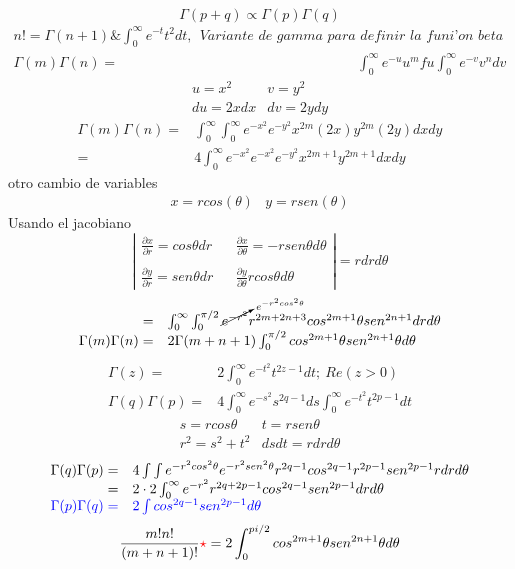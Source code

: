 \documentclass{article}
\theoremstyle{definition}
\begin{document}
\[\Gamma (p+q)\propto \Gamma (p)\Gamma (q)\]
\[
\begin{array}{rl}
	n!= \Gamma (n+1)\& \int^{\infty}_0 e^{-t}t^2 dt,\ \ \textit{Variante de gamma para definir la funi'on beta}\\
	\Gamma (m)\Gamma (n)=& \int^{\infty}_0 e^{-u}u^m fu\int^{\infty}_0 e^{-v}v^n dv
\end{array}
\]
\[
\begin{array}{cc}
	u=x^2 & v=y^2\\
	du=2xdx & dv= 2ydy
\end{array}
\]
\[
\begin{array}{rl}
	\Gamma (m)\Gamma (n) =& \int^{\infty}_0 \int^{\infty}_0e^{-x^{2}}e^{-y^{2}}x^{2m}(2x)y^{2m}(2y)dxdy\\
	=& 4\int^{\infty}_0 e^{-x^{2}} e^{-x^{2}}e^{-y^{2}}x^{2m+1}y^{2m+1}dxdy
\end{array}
\]
otro cambio de variables
\[
\begin{array}{cc}
	x=rcos(\theta) & y=rsen(\theta)
\end{array}
\]
Usando el jacobiano
\[
\left|
\begin{array}{ccc}
	\frac{\partial x}{\partial r}= cos\theta dr && \frac{\partial x}{\partial \theta} =-rsen\theta d\theta\\
	\\
	\frac{\partial y}{\partial r} = sen\theta dr && \frac{\partial y}{\partial \theta} r cos\theta d\theta
\end{array}\right|
=rdrd\theta
\]
\[
\begin{array}{rl}
	=& \int^{\infty}_0\int^{\pi/2}_0 \cancelto{e^{-r^2cos^2\theta}}{e^{-r^2}} r^{2m+2n+3} cos^{2m+1}\theta sen ^{2n+1}drd\theta\\
	\Gamma (m)\Gamma (n) =& 2 \Gamma (m+n+1)\int^{\pi/2}_0 cos^{2m+1}\theta sen^{2n+1}\theta d\theta
\end{array}
\]
\[
\begin{array}{rl}
	\Gamma (z)=& 2 \int^{\infty}_0 e^{-t^2}t^{2z-1}dt;\ Re(z>0)\\
	\Gamma (q)\Gamma (p) =& 4\int^{\infty}_0 e^{-s^2} s^{2q-1}ds\int^{\infty}_0 e^{-t^2}t^{2p-1}dt
\end{array}
\]
\[
\begin{array}{cc}
	s=rcos\theta & t=rsen\theta\\
	r^2=s^2+t^2 & dsdt=rdrd\theta
\end{array}
\]
\[
\begin{array}{rl}
	\Gamma (q)\Gamma (p)=& 4\int\int e^{-r^2cos^2\theta}e^{-r^2sen^2\theta}r^{2q-1}cos^{2q-1}r^{2p-1}sen^{2p-1}rdrd\theta\\
	=& 2\cdot 2 \int^{\infty}_0 e^{-r^2}r^{2q+2p-1}cos^{2q-1}sen^{2p-1}drd\theta\\
	\textcolor{blue}{\Gamma (p)\Gamma (q)=}&\textcolor{blue}{2\int cos^{2q-1}sen^{2p-1} d\theta}
\end{array}
\]
\[\frac{m! n!}{(m+n+1)!}\textcolor{red}{\star}= 2\int^{pi /2}_0 cos^{2m+1}\theta sen^{2n+1}\theta d \theta\]
\end{document}
